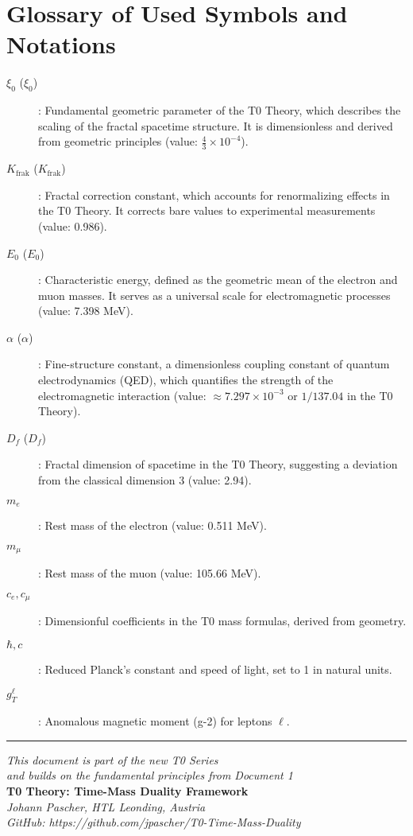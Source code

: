 \documentclass[12pt,a4paper]{article}
\newcommand{\xipar}{\xi_0}
\newcommand{\Kfrak}{K_{\text{frak}}}
\newcommand{\Ezero}{E_0}
\newcommand{\alphaem}{\alpha}
\newcommand{\Dfrak}{D_f}
\begin{document}
	\section{Glossary of Used Symbols and Notations}
	\begin{description}
		\item[$\xipar$ ($\xi_0$)]: Fundamental geometric parameter of the T0 Theory, which describes the scaling of the fractal spacetime structure. It is dimensionless and derived from geometric principles (value: $\frac{4}{3} \times 10^{-4}$).
		\item[$\Kfrak$ ($K_{\text{frak}}$)]: Fractal correction constant, which accounts for renormalizing effects in the T0 Theory. It corrects bare values to experimental measurements (value: 0.986).
		\item[$\Ezero$ ($E_0$)]: Characteristic energy, defined as the geometric mean of the electron and muon masses. It serves as a universal scale for electromagnetic processes (value: 7.398 MeV).
		\item[$\alphaem$ ($\alpha$)]: Fine-structure constant, a dimensionless coupling constant of quantum electrodynamics (QED), which quantifies the strength of the electromagnetic interaction (value: $\approx 7.297 \times 10^{-3}$ or $1/137.04$ in the T0 Theory).
		\item[$\Dfrak$ ($D_f$)]: Fractal dimension of spacetime in the T0 Theory, suggesting a deviation from the classical dimension 3 (value: 2.94).
		\item[$m_e$]: Rest mass of the electron (value: 0.511 MeV).
		\item[$m_\mu$]: Rest mass of the muon (value: 105.66 MeV).
		\item[$c_e, c_\mu$]: Dimensionful coefficients in the T0 mass formulas, derived from geometry.
		\item[$\hbar, c$]: Reduced Planck's constant and speed of light, set to 1 in natural units.
		\item[$g_T^\ell$]: Anomalous magnetic moment (g-2) for leptons $\ell$.
	\end{description}
	
	\begin{center}
		\hrule
		\vspace{0.5cm}
		\textit{This document is part of the new T0 Series}\\
		\textit{and builds on the fundamental principles from Document 1}\\
		\vspace{0.3cm}
		\textbf{T0 Theory: Time-Mass Duality Framework}\\
		\textit{Johann Pascher, HTL Leonding, Austria}\\
				\textit{GitHub: https://github.com/jpascher/T0-Time-Mass-Duality}
		\vspace{0.3cm}
	\end{center}
	
	
	
\end{document}
